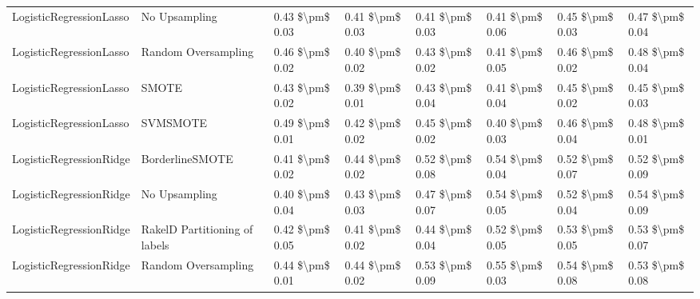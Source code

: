 \begin{tabular}{llllllll}
        LogisticRegressionLasso &                 No Upsampling & 0.43 \$\textbackslash pm\$ 0.03 &           0.41 \$\textbackslash pm\$ 0.03 &       0.41 \$\textbackslash pm\$ 0.03 &        0.41 \$\textbackslash pm\$ 0.06 &                         0.45 \$\textbackslash pm\$ 0.03 &     0.47 \$\textbackslash pm\$ 0.04 \\
        LogisticRegressionLasso &           Random Oversampling & 0.46 \$\textbackslash pm\$ 0.02 &           0.40 \$\textbackslash pm\$ 0.02 &       0.43 \$\textbackslash pm\$ 0.02 &        0.41 \$\textbackslash pm\$ 0.05 &                         0.46 \$\textbackslash pm\$ 0.02 &     0.48 \$\textbackslash pm\$ 0.04 \\
        LogisticRegressionLasso &                         SMOTE & 0.43 \$\textbackslash pm\$ 0.02 &           0.39 \$\textbackslash pm\$ 0.01 &       0.43 \$\textbackslash pm\$ 0.04 &        0.41 \$\textbackslash pm\$ 0.04 &                         0.45 \$\textbackslash pm\$ 0.02 &     0.45 \$\textbackslash pm\$ 0.03 \\
        LogisticRegressionLasso &                      SVMSMOTE & 0.49 \$\textbackslash pm\$ 0.01 &           0.42 \$\textbackslash pm\$ 0.02 &       0.45 \$\textbackslash pm\$ 0.02 &        0.40 \$\textbackslash pm\$ 0.03 &                         0.46 \$\textbackslash pm\$ 0.04 &     0.48 \$\textbackslash pm\$ 0.01 \\
        LogisticRegressionRidge &               BorderlineSMOTE & 0.41 \$\textbackslash pm\$ 0.02 &           0.44 \$\textbackslash pm\$ 0.02 &       0.52 \$\textbackslash pm\$ 0.08 &        0.54 \$\textbackslash pm\$ 0.04 &                         0.52 \$\textbackslash pm\$ 0.07 &     0.52 \$\textbackslash pm\$ 0.09 \\
        LogisticRegressionRidge &                 No Upsampling & 0.40 \$\textbackslash pm\$ 0.04 &           0.43 \$\textbackslash pm\$ 0.03 &       0.47 \$\textbackslash pm\$ 0.07 &        0.54 \$\textbackslash pm\$ 0.05 &                         0.52 \$\textbackslash pm\$ 0.04 &     0.54 \$\textbackslash pm\$ 0.09 \\
        LogisticRegressionRidge & RakelD Partitioning of labels & 0.42 \$\textbackslash pm\$ 0.05 &           0.41 \$\textbackslash pm\$ 0.02 &       0.44 \$\textbackslash pm\$ 0.04 &        0.52 \$\textbackslash pm\$ 0.05 &                         0.53 \$\textbackslash pm\$ 0.05 &     0.53 \$\textbackslash pm\$ 0.07 \\
        LogisticRegressionRidge &           Random Oversampling & 0.44 \$\textbackslash pm\$ 0.01 &           0.44 \$\textbackslash pm\$ 0.02 &       0.53 \$\textbackslash pm\$ 0.09 &        0.55 \$\textbackslash pm\$ 0.03 &                         0.54 \$\textbackslash pm\$ 0.08 &     0.53 \$\textbackslash pm\$ 0.08 \\

\end{tabular}
